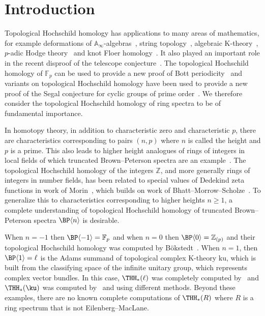 
\section{Introduction}
Topological Hochschild homology has applications to many areas of mathematics, for example deformations of $\mathbb{A}_{\infty}$-algebras~\cite{Laz01}, string topology~\cite{CJ02}, algebraic K-theory~\cite{BHM93}, $p$-adic Hodge theory~\cite{BMS19}  and knot Floer homology~\cite{LOT15}. It also played an important role in the recent disproof of the telescope conjecture~\cite{BHLS23}. The topological Hochschild homology of $\mathbb{F}_p$ can be used to provide a new proof of Bott periodicity~\cite{HN20} and variants on topological Hochschild homology have been used to provide a new proof of the Segal conjecture for cyclic groups of prime order~\cites{HW21,AKZ25}. 
We therefore consider the topological Hochschild homology of ring spectra to be of fundamental importance. 

In homotopy theory, in addition to characteristic zero and characteristic $p$, there are characteristics corresponding to pairs $(n,p)$ where $n$ is called the height and $p$ is a prime. This also leads to higher height analogues of rings of integers in local fields of which truncated Brown--Peterson spectra are an example~\cite{Rog25}. The topological Hochschild homology of the integers $\mathbb{Z}$, and more generally rings of integers in number fields, has been related to special values of Dedekind zeta functions in work of Morin~\cite{Mor24}, which builds on work of Bhatt--Morrow--Scholze~\cite{BMS19}. To generalize this to characteristics corresponding to higher heights $n\ge 1$, a complete understanding of topological Hochschild homology of truncated Brown--Peterson spectra $\BP\langle n\rangle$ is desirable.



When $n=-1$ then $\BP\langle -1\rangle=\mathbb{F}_p$ and when $n=0$ then $\BP\langle 0\rangle=\mathbb{Z}_{(p)}$ and their topological Hochschild homology was computed by B\"okstedt~\cite{Bok85}. When $n=1$, then $\BP\langle 1\rangle=\ell$ is the Adams summand of topological complex K-theory $\mathrm{ku}$, which is built from the classifying space of the infinite unitary group, which represents complex vector bundles. In this case, $\THH_*(\ell)$ was completely computed by~\cite{AHL10} and $\THH_*(\ku)$ was computed by~\cite{Lee22} and \cite{Cha25} using different methods. Beyond these examples, there are no known complete computations of $\THH_*(R)$ where $R$ is a ring spectrum that is not Eilenberg--MacLane.

